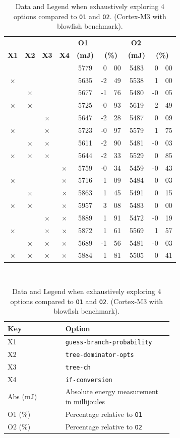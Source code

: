 \documentclass[twocolumn]{article}
\newcommand{\tY}{\checkmark}
\newcommand{\tN}{$\times$}
\begin{document}
\begin{table}[tb]
	\centering
	\begin{tabular}{c c c c c r@{.}l c r@{.}l }
		& & & \multicolumn{3}{c}{\hspace{1.5cm}\bfseries O1} & \multicolumn{3}{c}{\hspace{1.3cm}\bfseries O2} \\
		\bfseries X1 & \bfseries X2 & \bfseries X3 & \bfseries X4 & \bfseries (mJ) 	 & \multicolumn{2}{c}{\bfseries (\%)} &
		\bfseries (mJ) 	 & \multicolumn{2}{c}{\bfseries (\%)} \\
		\hline
		\tY&\tY&\tY&\tY& 5779 & 0&00 	&  5483 &  0&00\\
		\tN&\tY&\tY&\tY& 5635 & -2&49 	&  5538 &  1&00\\
		\tY&\tN&\tY&\tY& 5677 & -1&76 	&  5480 & -0&05\\
		\tN&\tN&\tY&\tY& 5725 & -0&93 	&  5619 &  2&49\\
		\tY&\tY&\tN&\tY& 5647 & -2&28 	&  5487 &  0&09\\
		\tN&\tY&\tN&\tY& 5723 & -0&97 	&  5579 &  1&75\\
		\tY&\tN&\tN&\tY& 5611 & -2&90 	&  5481 &  -0&03\\
		\tN&\tN&\tN&\tY& 5644 & -2&33 	&  5529 &  0&85\\

		\tY&\tY&\tY&\tN& 5759 & -0&34 	&  5459 &  -0&43\\
		\tN&\tY&\tY&\tN& 5716 & -1&09 	&  5484 &  0&03\\
		\tY&\tN&\tY&\tN& 5863 & 1&45 	&  5491 &  0&15\\
		\tN&\tN&\tY&\tN& 5957 & 3&08 	&  5483 &  0&00\\
		\tY&\tY&\tN&\tN& 5889 & 1&91 	&  5472 &  -0&19\\
		\tN&\tY&\tN&\tN& 5872 & 1&61 	&  5569 &  1&57\\
		\tY&\tN&\tN&\tN& 5689 & -1&56 	&  5481 &  -0&03\\
		\tN&\tN&\tN&\tN& 5884 & 1&81 	&  5505 &  0&41\\
	\end{tabular}\\[1em]

	\begin{tabular}{l p{0.65\linewidth}}
		\bfseries Key & \bfseries Option \\
		\hline
		X1 & \texttt{guess-branch-probability}  \\
		X2 & \texttt{tree-dominator-opts}  \\
		X3 & \texttt{tree-ch} \\
		X4 & \texttt{if-conversion} \\
		Abs (mJ) & Absolute energy measurement in millijoules \\
		O1 (\%) & Percentage relative to \texttt{O1} \\
		O2 (\%) & Percentage relative to \texttt{O2} \\
	\end{tabular}
	\caption{Data and Legend when exhaustively exploring 4 options compared to \texttt{O1} and \texttt{O2}. (Cortex-M3 with blowfish benchmark).}
	\label{Table:Exhaustive}
\end{table}
\end{document}
